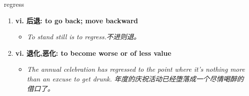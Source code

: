 
\begin{frame}
{\huge regress}
\begin{center}
\begin{enumerate}\Large
  \item \textbf{vi. 后退: to go back; move backward}
  \begin{itemize}
    \item \em{\Large{To stand still is to regress.不进则退。}}
  \end{itemize}
  \item \textbf{vi. 退化,恶化: to become worse or of less value}
  \begin{itemize}
    \item \em{\Large{The annual celebration has regressed to the point where it's nothing more than an excuse to get drunk. 年度的庆祝活动已经堕落成一个尽情喝醉的借口了。}}
  \end{itemize}
\end{enumerate}
\end{center}
\end{frame}
